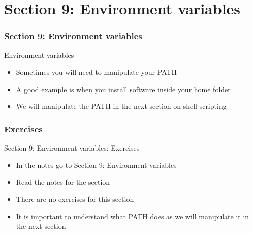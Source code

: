 \part{Section 9: Environment variables}
\begin{frame}
\partpage
\end{frame}

\section{Section 9: Environment variables}
\begin{frame}{Environment variables}
\begin{itemize}
\item Sometimes you will need to manipulate your PATH
\item A good example is when you install software inside your home folder
\item We will manipulate the PATH in the next section on shell scripting
\end{itemize}
\end{frame}


\section{Exercises}
\begin{frame}{Section 9: Environment variables: Exercises}
\begin{itemize}
\item In the notes go to {Section 9: Environment variables}
\item Read the notes for the section 
\item There are no exercises for this section
\item It is important to understand what PATH does as we will manipulate it in the next section
\end{itemize}
\end{frame}

